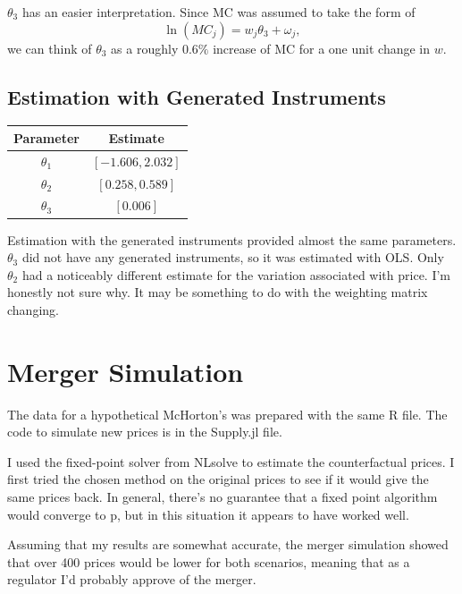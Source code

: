 \documentclass[12pt, letterpaper]{article}
\theoremstyle{definition}
\theoremstyle{remark}
\theoremstyle{definition}
\begin{document}
$\theta_3$ has an easier interpretation. Since MC was assumed to take the form of
\[
	\ln(MC_{j})=w_{j}\theta_{3}+\omega_{j},
\]
we can think of $\theta_3$ as a roughly $0.6\% $ increase of MC for a one unit change in $w$.

\newpage

\subsection{Estimation with Generated Instruments}

\begin{table}[ht]
    \centering
    \begin{tabular}{|c|c|}
        \hline
        \textbf{Parameter} & \textbf{Estimate} \\ \hline
        $\theta_1$  & $[ -1.606, 2.032]$ \\ \hline
        $\theta_2$  & $[0.258, 0.589]$ \\ \hline
        $\theta_3$  & $[0.006]$ \\ \hline
    \end{tabular}
\end{table}

Estimation with the generated instruments provided almost the same parameters. $\theta_3$ did not have any generated instruments, so it was estimated with OLS. Only $\theta_2$ had a noticeably different estimate for the variation associated with price. I'm honestly not sure why. It may be something to do with the weighting matrix changing.

\section{Merger Simulation}

The data for a hypothetical McHorton's was prepared with the same R file. The code to simulate new prices is in the Supply.jl file. 

I used the fixed-point solver from NLsolve to estimate the counterfactual prices. I first tried the chosen method on the original prices to see if it would give the same prices back. In general, there's no guarantee that a fixed point algorithm would converge to p, but in this situation it appears to have worked well.

Assuming that my results are somewhat accurate, the merger simulation showed that over 400 prices would be lower for both scenarios, meaning that as a regulator I'd probably approve of the merger.
\end{document}

